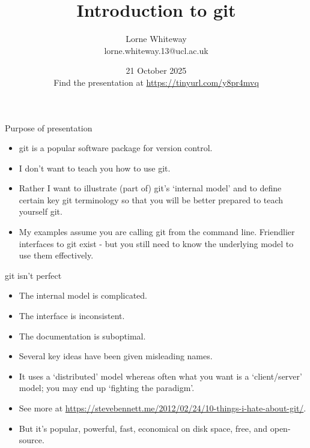\documentclass[usenames,dvipsnames]{beamer}
\title{Introduction to git}
\author{Lorne Whiteway \\ lorne.whiteway.13@ucl.ac.uk}
\institute{Astrophysics Group \\ Department of Physics and Astronomy \\ University College London}
\date{21 October 2025 \\ Find the presentation at \alert{\url{https://tinyurl.com/y8pr4mvq}}}
\begin{document}
\frame{\titlepage}

\begin{frame}{Purpose of presentation}
  \begin{block}{}
    \begin{itemize}
      \item{git is a popular software package for version control.}
      \item{I don't want to teach you how to use git.}
      \item{Rather I want to illustrate (part of) git's `internal model' and to define certain key git terminology so that you will be better prepared to teach yourself git.}
      \item{My examples assume you are calling git from the command line. Friendlier interfaces to git exist - but you still need to know the underlying model to use them effectively.}
    \end{itemize}
  \end{block}
\end{frame}


\begin{frame}{git isn't perfect}
  \begin{block}{}
    \begin{itemize}
      \item{The internal model is complicated.}
      \item{The interface is inconsistent.}
      \item{The documentation is suboptimal.}
      \item{Several key ideas have been given misleading names.}
      \item{It uses a `distributed' model whereas often what you want is a `client/server' model; you may end up `fighting the paradigm'.}
      \item{See more at \url{https://stevebennett.me/2012/02/24/10-things-i-hate-about-git/}.}
      \item{But it's popular, powerful, fast, economical on disk space, free, and open-source.}
    \end{itemize}
  \end{block}
\end{frame}
\end{document}
